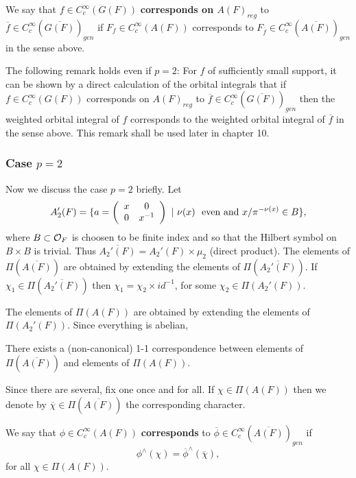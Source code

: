 \begin{definition} We say that
$f \in C_c^\infty(G(F))$ {\bf corresponds on $A(F)_{reg}$} to
$\overline{f}\in C_c^\infty(\overline{G(F)})_{gen}$
if $F_f\in C_c^\infty(A(F))$ corresponds to
$F_{\overline{f}}\in C_c^\infty(\overline{A(F)})_{gen}$
in the sense above.
\end{definition}

The following remark holds even if $p=2$:
For $f$ of sufficiently small support, it can be
shown by a direct calculation of the orbital integrals that if
$f \in C_c^\infty(G(F))$ corresponds on $A(F)_{reg}$ to
$\overline{f}\in C_c^\infty(\overline{G(F)})_{gen}$
then the weighted orbital integral of
$f$ corresponds to the weighted orbital integral of
$\overline{f}$ in the sense above.
This remark shall be used later in chapter 10.

\subsubsection{Case $p=2$}

Now we discuss the case $p=2$ briefly. Let
\[
A_2'(F)=\{
a=\left(
\begin{array}{cc}
x & 0\\
0 & x^{-1}
\end{array}
\right)
\ |\ \nu (x)\ {\rm \ even\ and\ }x/\pi^{-\nu(x)}\in B\},
\]
where $B\subset {\cal{O}}_F$ is choosen to be finite index and
so that the Hilbert symbol on $B\times B$ is trivial.
Thus $\overline{A_2'(F)}
=A_2'(F)\times \mu_2$ (direct product).
The elements of $\Pi(\overline{A(F)})$ are obtained by extending
the elements of $\Pi(\overline{A_2'(F)})$.
If $\chi_1\in \Pi(\overline{A_2'(F)})$ then
$\chi_1=\chi_2\times id^{-1}$,
for some $\chi_2\in \Pi(A_2'(F))$.

The elements of $\Pi(A(F))$ are obtained by extending
the elements of $\Pi(A_2'(F))$. Since everything is abelian,
\begin{lemma} There exists a (non-canonical) 1-1 correspondence
between elements of $\Pi(\overline{A(F)})$ and
elements of $\Pi(A(F))$. 
\end{lemma}

Since there are several, fix one
once and for all.
If $\chi\in \Pi(A(F))$ then
we denote by $\overline{\chi}\in \Pi(\overline{A(F)})$
the corresponding character.

\begin{definition}
We say that $\phi \in C_c^\infty(A(F))$ {\bf corresponds} to
$\overline{\phi}\in C_c^\infty(\overline{A(F)})_{gen}$
if
\[
\phi^{\wedge}(\chi)=
\overline{\phi}^{\wedge}(\overline{\chi}),
\]
for all $\chi \in \Pi(A(F))$.
\end{definition}

